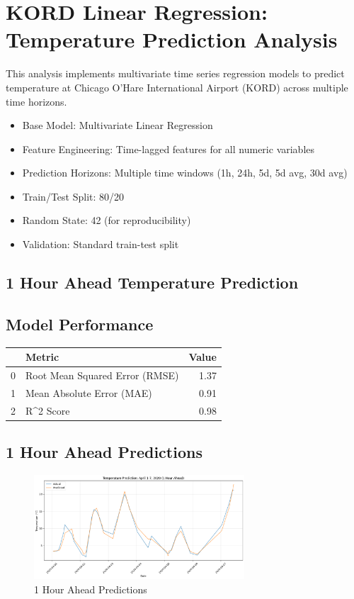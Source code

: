 \section{KORD Linear Regression: Temperature Prediction Analysis}
This analysis implements multivariate time series regression models to predict temperature at Chicago O'Hare International Airport (KORD) across multiple time horizons.\
\begin{itemize}
  \item Base Model: Multivariate Linear Regression
  \item Feature Engineering: Time-lagged features for all numeric variables
  \item Prediction Horizons: Multiple time windows (1h, 24h, 5d, 5d avg, 30d avg)
  \item Train/Test Split: 80/20
  \item Random State: 42 (for reproducibility)
  \item Validation: Standard train-test split
\end{itemize}

\subsection{1 Hour Ahead Temperature Prediction}
\subsection{Model Performance}
\begin{tabular}{llr}
\toprule
 & Metric & Value \\
\midrule
0 & Root Mean Squared Error (RMSE) & 1.37 \\
1 & Mean Absolute Error (MAE) & 0.91 \\
2 & R^2 Score & 0.98 \\
\bottomrule
\end{tabular}

\subsection{1 Hour Ahead Predictions}
\begin{figure}[htbp]
\centering
\includegraphics[width=0.7\textwidth]{5-0-linear_temp_prediction_results.png}
\caption{1 Hour Ahead Predictions}
\label{fig:1_hour_ahead_pred}
\end{figure}

